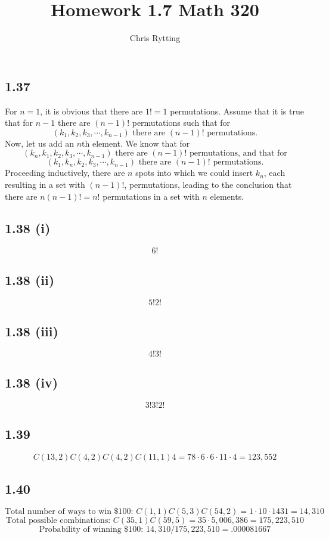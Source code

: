 \documentclass[letterpaper,12pt]{article}
\theoremstyle{definition}
\begin{document}
\title{Homework 1.7 Math 320}
\author{Chris Rytting}
\maketitle

\subsection*{1.37}
For $n=1$, it is obvious that there are $1! = 1$ permutations.
Assume that it is true that for $n-1$ there are $(n-1)!$ permutations such that for 
\[(k_1,k_2,k_3,\cdots,k_{n-1}) \text{ there are $(n-1)!$ permutations}.\]
Now, let us add an $n$th element. We know that for 
\[(k_n, k_1,k_2,k_3,\cdots,k_{n-1}) \text{ there are $(n-1)!$ permutations, and that for}\]
\[(k_1,k_n, k_2,k_3,\cdots,k_{n-1}) \text{ there are $(n-1)!$ permutations}.\]
Proceeding inductively, there are $n$ spots into which we could insert $k_n$, each resulting in a set with $(n-1)!$, permutations, leading to the conclusion that there are $n(n-1)!=n!$ permutations in a set with $n$ elements.

\subsection*{1.38 (i)}
\[ 6! \]

\subsection*{1.38 (ii)}
\[ 5!2! \]

\subsection*{1.38 (iii)}
\[ 4!3! \]

\subsection*{1.38 (iv)}
\[ 3!3!2! \]

\subsection*{1.39}
\[C(13,2)C(4,2)C(4,2)C(11,1)4 = 78\cdot6\cdot6\cdot11\cdot4 = 123,552\]

\subsection*{1.40}
\[\text{Total number of ways to win \$100: }C(1,1)C(5,3)C(54,2) = 1 \cdot 10 \cdot 1431 = 14,310\]
\[\text{Total possible combinations: }C(35,1)C(59,5) = 35\cdot5,006,386 = 175,223,510\]
\[\text{Probability of winning \$100: }14,310/175,223,510 = .000081667\]
\end{document}
